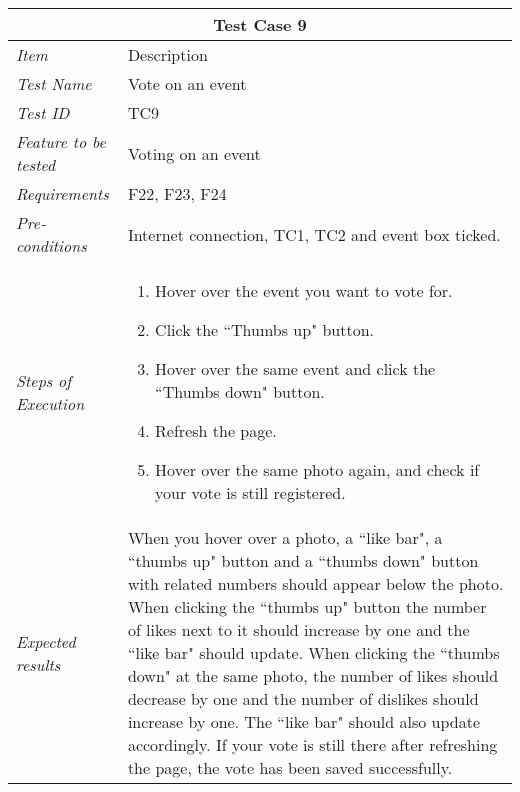 %
\begin{minipage}{\linewidth}
\setlength{\tabcolsep}{15pt}
\centering
{}
\begin{tabular}{ |l|p{70mm}| }
	\hline
	\multicolumn{2}{|c|}{\cellcolor{gray!25} \textbf{Test Case 9}} \\
	\hline
	\it{\cellcolor{gray!25}Item} & {\cellcolor{gray!25} Description } \\
	\hline
	\it{\cellcolor{gray!25}Test Name } & Vote on an event \\ \hline
	\it{\cellcolor{gray!25}Test ID} & TC9 \\ \hline
	\it{\cellcolor{gray!25}Feature to be tested} & Voting on an event \\ \hline
	\it{\cellcolor{gray!25}Requirements} & F22, F23, F24  \\ \hline
	\it{\cellcolor{gray!25}Pre-conditions} & Internet connection, TC1, TC2 and event box ticked.  \\ \hline
	\it{\cellcolor{gray!25}Steps of Execution} & \begin{enumerate}
	                                       \item Hover over the event you want to vote for.
	                                       \item Click the ``Thumbs up" button.
	                                       \item Hover over the same event and click the ``Thumbs down" button.
	                                       \item Refresh the page.
	                                       \item Hover over the same photo again, and check if your vote is still registered.
	                                     \end{enumerate} \\ \hline
	\it{\cellcolor{gray!25}Expected results} & When you hover over a photo, a ``like bar", a ``thumbs up" button and a ``thumbs down" button with related numbers should appear below the photo. When clicking the ``thumbs up" button the number of likes next to it should increase by one and the ``like bar" should update. When clicking the ``thumbs down" at the same photo, the number of likes should decrease by one and the number of dislikes should increase by one. The ``like bar" should also update accordingly. If your vote is still there after refreshing the page, the vote has been saved successfully. \\
	\hline
\end{tabular}
\medskip
\end{minipage}
